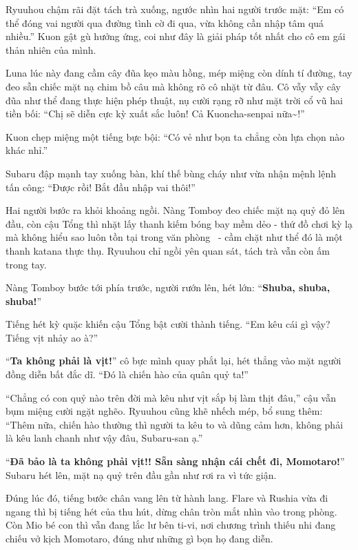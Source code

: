 \documentclass[../main.tex]{subfiles}
\begin{document}
Ryuuhou chậm rãi đặt tách trà xuống, ngước nhìn hai người trước mặt: ``Em có thể đóng vai người qua đường tình cờ đi qua, vừa không cần nhập tâm quá nhiều.'' Kuon gật gù hưởng ứng, coi như đây là giải pháp tốt nhất cho cô em gái thản nhiên của mình.

Luna lúc này đang cầm cây đũa kẹo màu hồng, mép miệng còn dính tí đường, tay đeo sẵn chiếc mặt nạ chim bồ câu mà không rõ cô nhặt từ đâu. Cô vẫy vẫy cây đũa như thể đang thực hiện phép thuật, nụ cười rạng rỡ như mặt trời cổ vũ hai tiền bối: ``Chị sẽ diễn cực kỳ xuất sắc luôn! Cả Kuoncha-senpai nữa\~{}!''


Kuon chẹp miệng một tiếng bực bội: ``Có vẻ như bọn ta chẳng còn lựa chọn nào khác nhỉ.''

Subaru đập mạnh tay xuống bàn, khí thế bùng cháy như vừa nhận mệnh lệnh tấn công: ``Được rồi! Bắt đầu nhập vai thôi!''

Hai người bước ra khỏi khoảng ngồi. Nàng Tomboy đeo chiếc mặt nạ quỷ đỏ lên đầu, còn cậu Tổng thì nhặt lấy thanh kiếm bóng bay mềm dẻo - thứ đồ chơi kỳ lạ mà không hiểu sao luôn tồn tại trong văn phòng \hll\ - cầm chặt như thể đó là một thanh katana thực thụ. Ryuuhou chỉ ngồi yên quan sát, tách trà vẫn còn ấm trong tay.

Nàng Tomboy bước tới phía trước, người rướn lên, hét lớn: ``\textbf{Shuba, shuba, shuba!}''

Tiếng hét kỳ quặc khiến cậu Tổng bật cười thành tiếng. ``Em kêu cái gì vậy? Tiếng vịt nhảy ao à?''

``\textbf{Ta không phải là vịt!}'' cô bực mình quay phắt lại, hét thẳng vào mặt người đồng diễn bất đắc dĩ. ``Đó là chiến hào của quân quỷ ta!''

``Chẳng có con quỷ nào trên đời mà kêu như vịt sắp bị làm thịt đâu,'' cậu vẫn bụm miệng cười ngặt nghẽo. Ryuuhou cũng khẽ nhếch mép, bổ sung thêm: ``Thêm nữa, chiến hào thường thì người ta kêu to và dũng cảm hơn, không phải là kêu lanh chanh như vậy đâu, Subaru-san ạ.''

``\textbf{Đã bảo là ta không phải vịt!! Sẵn sàng nhận cái chết đi, Momotaro!}'' Subaru hét lên, mặt nạ quỷ trên đầu gần như rơi ra vì tức giận.

Đúng lúc đó, tiếng bước chân vang lên từ hành lang. Flare và Rushia vừa đi ngang thì bị tiếng hét của thu hút, dừng chân tròn mắt nhìn vào trong phòng. Còn Mio bé con thì vẫn đang lắc lư bên ti-vi, nơi chương trình thiếu nhi đang chiếu vở kịch Momotaro, đúng như những gì bọn họ đang diễn.
\end{document}
